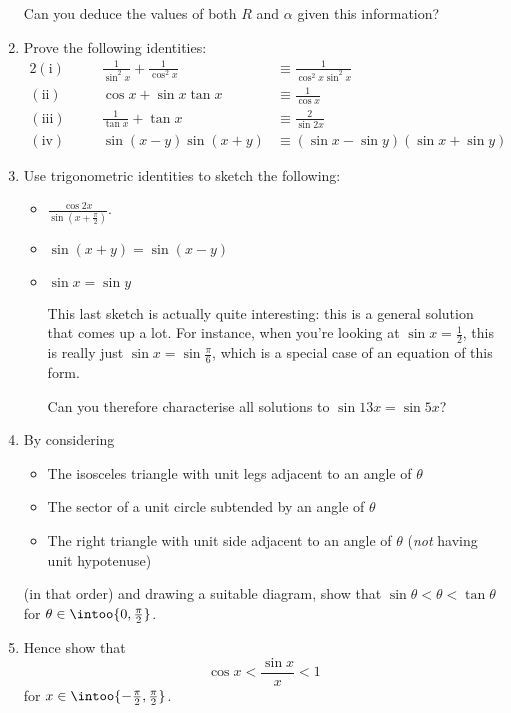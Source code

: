\begin{enumerate}
  Can you deduce the values of both \(R\) and \(\alpha\) given this information?
 \item
  Prove the following identities:
  \begin{alignat*}2
   (\mathrm{i})&&\quad\frac 1{\sin^2 x} + \frac 1{\cos^2 x}
   &\equiv \frac 1{\cos^2 x \sin^2 x} \\
   (\mathrm{ii})&&\quad\cos x + \sin x \tan x
   &\equiv \frac 1{\cos x} \\
   (\mathrm{iii})&&\quad\frac 1{\tan x} + \tan x
   &\equiv \frac 2{\sin 2x} \\
   (\mathrm{iv})&&\quad\sin(x - y) \sin(x + y)
   &\equiv (\sin x - \sin y)(\sin x + \sin y)
  \end{alignat*}
 \item
  Use trigonometric identities to sketch the following:
  \begin{itemize}
   \item
    \(\displaystyle \frac{\cos 2x}{\sin(x + \frac \pi 2)}\).
   \item
    \(\sin(x + y) = \sin(x - y)\)
   \item
    \(\sin x = \sin y\)

    This last sketch is actually quite interesting: this is a general solution
    that comes up a lot. For instance, when you're looking at
    \(\sin x = \frac 12\), this is really just \(\sin x = \sin \frac \pi 6\),
    which is a special case of an equation of this form.

    Can you therefore characterise all solutions to \(\sin 13x = \sin 5x\)?
  \end{itemize}
 \item
  By considering
  \begin{itemize}
   \item
    The isosceles triangle with unit legs adjacent to an angle of \(\theta\)
   \item
    The sector of a unit circle subtended by an angle of \(\theta\)
   \item
    The right triangle with unit side adjacent to an angle of \(\theta\)
    (\emph{not} having unit hypotenuse)
  \end{itemize}
  (in that order) and drawing a suitable diagram, show that
  \(\sin \theta < \theta < \tan \theta\) for
  \(\theta \in \intoo{0, \frac \pi 2}\).
 \item
  Hence show that
  \begin{equation*}
   \cos x < \frac{\sin x}x < 1
  \end{equation*}
  for \(x \in \intoo{-\frac \pi 2, \frac \pi 2}\).


\end{enumerate}
